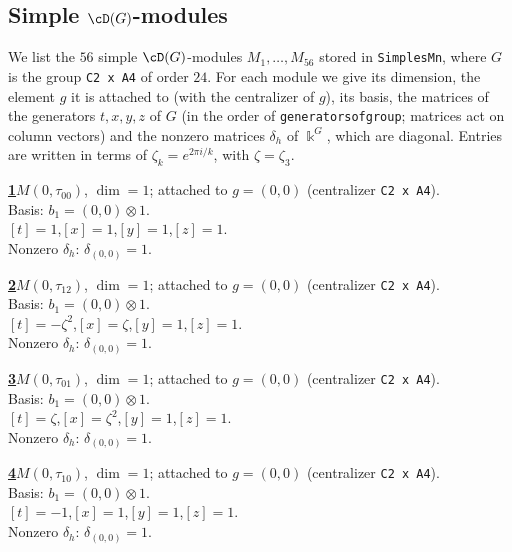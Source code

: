 \subsection{Simple $\cD(G)$-modules}
\label{subsec:simples_summary}
We list the $56$ simple $\cD(G)$-modules $M_1,\dots,M_{56}$ stored in \texttt{SimplesMn}, where $G$ is the group \texttt{C2 x A4} of order $24$. For each module we give its dimension, the element $g$ it is attached to (with the centralizer of $g$), its basis, the matrices of the generators $t,x,y,z$ of $G$ (in the order of \texttt{generatorsofgroup}; matrices act on column vectors) and the nonzero matrices $\delta_h$ of $\Bbbk^G$, which are diagonal. Entries are written in terms of $\zeta_k=e^{2\pi i/k}$, with $\zeta=\zeta_3$.

\begin{samepage}\noindent\textbf{\underline{1}}\quad $M(0,\tau_{00})$, $\dim=1$; attached to $g=(0,0)$ (centralizer \texttt{C2 x A4}).\\
Basis: $b_{1}=(0,0)\otimes 1$.\\
$[t]=1$,\quad $[x]=1$,\quad $[y]=1$,\quad $[z]=1$.\\
Nonzero $\delta_h$: $\delta_{(0,0)}=1$.\end{samepage}
\medskip

\begin{samepage}\noindent\textbf{\underline{2}}\quad $M(0,\tau_{12})$, $\dim=1$; attached to $g=(0,0)$ (centralizer \texttt{C2 x A4}).\\
Basis: $b_{1}=(0,0)\otimes 1$.\\
$[t]=-\zeta^2$,\quad $[x]=\zeta$,\quad $[y]=1$,\quad $[z]=1$.\\
Nonzero $\delta_h$: $\delta_{(0,0)}=1$.\end{samepage}
\medskip

\begin{samepage}\noindent\textbf{\underline{3}}\quad $M(0,\tau_{01})$, $\dim=1$; attached to $g=(0,0)$ (centralizer \texttt{C2 x A4}).\\
Basis: $b_{1}=(0,0)\otimes 1$.\\
$[t]=\zeta$,\quad $[x]=\zeta^2$,\quad $[y]=1$,\quad $[z]=1$.\\
Nonzero $\delta_h$: $\delta_{(0,0)}=1$.\end{samepage}
\medskip

\begin{samepage}\noindent\textbf{\underline{4}}\quad $M(0,\tau_{10})$, $\dim=1$; attached to $g=(0,0)$ (centralizer \texttt{C2 x A4}).\\
Basis: $b_{1}=(0,0)\otimes 1$.\\
$[t]=-1$,\quad $[x]=1$,\quad $[y]=1$,\quad $[z]=1$.\\
Nonzero $\delta_h$: $\delta_{(0,0)}=1$.\end{samepage}
\medskip

